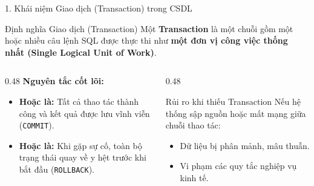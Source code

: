 \documentclass[aspectratio=169,11pt]{beamer}
\newcommand{\code}[1]{\texttt{#1}}
\begin{document}
\begin{frame}{1. Khái niệm Giao dịch (Transaction) trong CSDL}
  \begin{block}{Định nghĩa Giao dịch (Transaction)}
    Một \textbf{Transaction} là một chuỗi gồm một hoặc nhiều câu lệnh SQL được thực thi như \textbf{một đơn vị công việc thống nhất (Single Logical Unit of Work)}.
  \end{block}
  \vspace{0.3em}
  \begin{columns}[T]
    \begin{column}{0.48\textwidth}
      \textbf{Nguyên tắc cốt lõi:}
      \begin{itemize}
        \item \textbf{Hoặc là:} Tất cả thao tác thành công và kết quả được lưu vĩnh viễn (\code{COMMIT}).
        \item \textbf{Hoặc là:} Khi gặp sự cố, toàn bộ trạng thái quay về y hệt trước khi bắt đầu (\code{ROLLBACK}).
      \end{itemize}
    \end{column}
    \begin{column}{0.48\textwidth}
      \begin{alertblock}{Rủi ro khi thiếu Transaction}
        Nếu hệ thống sập nguồn hoặc mất mạng giữa chuỗi thao tác:
        \begin{itemize}
          \item Dữ liệu bị phân mảnh, mâu thuẫn.
          \item Vi phạm các quy tắc nghiệp vụ kinh tế.
        \end{itemize}
      \end{alertblock}
    \end{column}
  \end{columns}
\end{frame}
\end{document}
